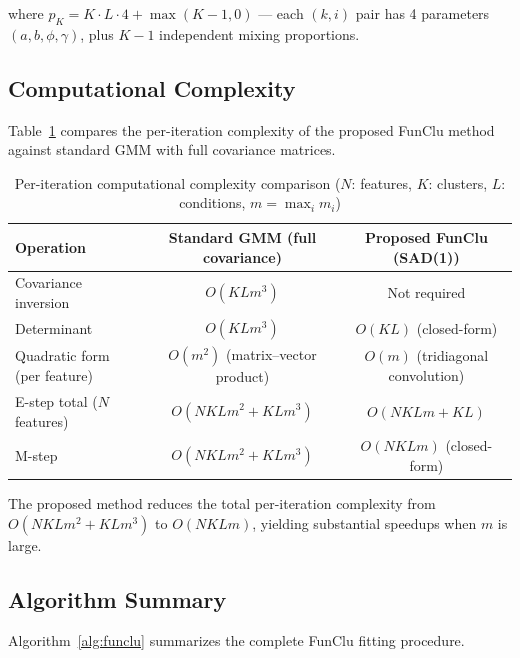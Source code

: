 \documentclass[12pt,a4paper]{article}
\begin{document}
where $p_K = K \cdot L \cdot 4 + \max(K-1, 0)$ --- each $(k,i)$ pair has 4 parameters $(a, b, \phi, \gamma)$, plus $K-1$ independent mixing proportions.

\subsection{Computational Complexity}

Table~\ref{tab:complexity} compares the per-iteration complexity of the proposed FunClu method against standard GMM with full covariance matrices.

\begin{table}[htbp]
    \centering
    \caption{Per-iteration computational complexity comparison ($N$: features, $K$: clusters, $L$: conditions, $m = \max_i m_i$)}
    \label{tab:complexity}
    \begin{tabular}{lcc}
        \toprule
        Operation & Standard GMM (full covariance) & Proposed FunClu (SAD(1)) \\
        \midrule
        Covariance inversion & $O(K L m^3)$ & Not required \\
        Determinant & $O(K L m^3)$ & $O(K L)$ (closed-form) \\
        Quadratic form (per feature) & $O(m^2)$ (matrix--vector product) & $O(m)$ (tridiagonal convolution) \\
        E-step total ($N$ features) & $O(N K L m^2 + K L m^3)$ & $O(N K L m + K L)$ \\
        M-step & $O(N K L m^2 + K L m^3)$ & $O(N K L m)$ (closed-form) \\
        \bottomrule
    \end{tabular}
\end{table}

The proposed method reduces the total per-iteration complexity from $O(N K L m^2 + K L m^3)$ to $O(N K L m)$, yielding substantial speedups when $m$ is large.

\subsection{Algorithm Summary}

Algorithm~\ref{alg:funclu} summarizes the complete FunClu fitting procedure.
\end{document}

